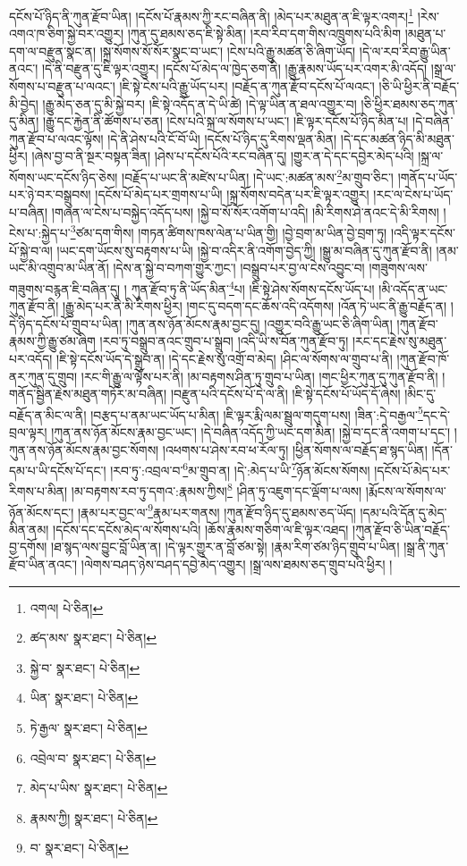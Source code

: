དངོས་པོ་ཉིད་ནི་ཀུན་རྫོབ་ཡིན། །དངོས་པོ་རྣམས་ཀྱི་རང་བཞིན་ནི། །མེད་པར་མཐུན་ན་ཇི་ལྟར་འགར།\footnote{འགལ།  པེ་ཅིན། } །རེས་འགའ་ཁ་ཅིག་སྐྱེ་བར་འགྱུར། །ཀུན་དུ་ཐམས་ཅད་ཇི་སྟེ་མིན། །རབ་རིབ་དག་གིས་འཁྲུགས་པའི་མིག །མཐུན་པ་དག་ལ་བརྫུན་སྣང་ན། །སྐྲ་སོགས་སོ་སོར་སྣང་བ་ཡང་། །ངེས་པའི་རྒྱུ་མཚན་ཅི་ཞིག་ཡོད། །དེ་ལ་རབ་རིབ་རྒྱུ་ཡིན་ནའང་། །དེ་ནི་བརྫུན་དུ་ཇི་ལྟར་འགྱུར། །དངོས་པོ་མེད་ལ་ཁྱེད་ཅག་ནི། །རྒྱུ་རྣམས་ཡོད་པར་འགར་མི་འདོད། །སྒྲ་ལ་སོགས་པ་བརྫུན་པ་ལའང་། །ཇི་སྟེ་ངེས་པའི་རྒྱུ་ཡོད་པར། །བརྗོད་ན་ཀུན་རྫོབ་དངོས་པོ་ལའང་། །ཅི་ཡི་ཕྱིར་ནི་བརྗོད་མི་བྱེད། །རྒྱུ་མེད་ཅན་དུ་མི་སྐྱེ་བར། །ཇི་སྟེ་འདོད་ན་དེ་ཡི་ཚེ། །དེ་ལྟ་ཡིན་ན་ཐལ་འགྱུར་བ། །ཅི་ཕྱིར་ཐམས་ཅད་ཀུན་དུ་མིན། །རྒྱུ་དང་རྐྱེན་ནི་ཚོགས་པ་ཅན། །ངེས་པའི་སྐྲ་ལ་སོགས་པ་ཡང་། །ཇི་ལྟར་དངོས་པོ་ཉིད་མིན་པ། །དེ་བཞིན་ཀུན་རྫོབ་པ་ལའང་ལྟོས། །དེ་ནི་ཤེས་པའི་ངོ་བོ་ཡི། །དངོས་པོ་ཉིད་དུ་རིགས་ལྡན་མིན། །དེ་དང་མཚན་ཉིད་མི་མཐུན་ཕྱིར། །ཞེས་བྱ་བ་ནི་སྔར་བསྟན་ཟིན། །ཤེས་པ་དངོས་པོའི་རང་བཞིན་དུ། །གྱུར་ན་དེ་དང་དབྱེར་མེད་པའི། །སྐྲ་ལ་སོགས་ཡང་དངོས་ཉིད་ཅེས། །བརྗོད་པ་ཡང་ནི་མཛེས་པ་ཡིན། །དེ་ཡང་:མཚན་མས་\footnote{ཚད་མས་  སྣར་ཐང་།  པེ་ཅིན། }མ་གྲུབ་ཅིང་། །གནོད་པ་ཡོད་པར་ཉེ་བར་བསྒྲུབས། །དངོས་པོ་མེད་པར་གྲགས་པ་ཡི། །སྐྲ་སོགས་བདེན་པར་ཇི་ལྟར་འགྱུར། །རང་ལ་ངེས་པ་ཡོད་པ་བཞིན། །གཞན་ལ་ངེས་པ་བསྐྱེད་འདོད་པས། །སྐྱེ་བ་སོ་སོར་འགོག་པ་འདི། །མི་རིགས་ཤེ་ནའང་དེ་མི་རིགས། །ངེས་པ་:སྐྱེད་པ་\footnote{སྐྱེ་བ་  སྣར་ཐང་།  པེ་ཅིན། }ཙམ་དག་གིས། །གཏན་ཚིགས་ཁས་ལེན་པ་ཡིན་གྱི། །བྱེ་བྲག་མ་ཡིན་བྱེ་བྲག་ཏུ། །འདི་ལྟར་དངོས་པོ་སྐྱེ་བ་ལ། །ཡང་དག་ཡོངས་སུ་བརྟགས་པ་ཡི། །སྐྱེ་བ་འདིར་ནི་འགོག་བྱེད་ཀྱི། །སྒྱུ་མ་བཞིན་དུ་ཀུན་རྫོབ་ནི། །ནམ་ཡང་མི་འགྲུབ་མ་ཡིན་ནོ། །དེས་ན་སྐྱེ་བ་བཀག་གྱུར་ཀྱང་། །བསྒྲུབ་པར་བྱ་ལ་ངེས་འབྱུང་བ། །གཟུགས་ལས་གཟུགས་བརྙན་ཇི་བཞིན་དུ། །
ཀུན་རྫོབ་ཏུ་ནི་ཡོད་མིན་\footnote{ཡིན་  སྣར་ཐང་།  པེ་ཅིན། }པ། །ཇི་སྟེ་ཤེས་སོགས་དངོས་ཡོད་པ། །མི་འདོད་ན་ཡང་ཀུན་རྫོབ་ནི། །རྒྱུ་མེད་པར་ནི་མི་རིགས་ཕྱིར། །གང་དུ་བདག་དང་ཆོས་འདི་འདོགས། །འོན་ཏེ་ཡང་ནི་རྒྱུ་བརྗོད་ན། །དེ་ཉིད་དངོས་པོ་གྲུབ་པ་ཡིན། །ཀུན་ནས་ཉོན་མོངས་རྣམ་བྱང་དུ། །འགྱུར་བའི་རྒྱུ་ཡང་ཅི་ཞིག་ཡིན། །ཀུན་རྫོབ་རྣམས་ཀྱི་རྒྱུ་ཙམ་ཞིག །རབ་ཏུ་བསྒྲུབ་ནའང་གྲུབ་པ་སྒྲུབ། །འདི་ཡི་ས་བོན་ཀུན་རྫོབ་ཏུ། །རང་དང་རྗེས་སུ་མཐུན་པར་འདོད། །ཇི་སྟེ་དངོས་ཡོད་དེ་སྒྲུབ་ན། །དེ་དང་རྗེས་སུ་འགྲོ་བ་མེད། །ཤིང་ལ་སོགས་ལ་གྲུབ་པ་ནི། །ཀུན་རྫོབ་ཁོ་ནར་ཀུན་དུ་གྲུབ། །རང་གི་རྒྱུ་ལ་ལྟོས་པར་ནི། །མ་བརྟགས་ཤིན་ཏུ་གྲུབ་པ་ཡིན། །གང་ཕྱིར་ཀུན་དུ་ཀུན་རྫོབ་ནི། །གནོད་སྦྱིན་རྗེས་མཐུན་གཏོར་མ་བཞིན། །བརྫུན་པའི་དངོས་པོ་དེ་ལ་ནི། །ཇི་སྟེ་དངོས་པོ་ཡོད་དོ་ཞེས། །མིང་དུ་བརྗོད་ན་མིང་ལ་ནི། །བརྩད་པ་ནམ་ཡང་ཡོད་པ་མིན། །ཇི་ལྟར་རྨི་ལམ་སྦྲུལ་གདུག་པས། །ཟིན་:དེ་བརྒྱལ་\footnote{ཏེ་རྒྱལ་  སྣར་ཐང་།  པེ་ཅིན། }དང་དེ་བྲལ་ལྟར། །ཀུན་ནས་ཉོན་མོངས་རྣམ་བྱང་ཡང་། །དེ་བཞིན་འདོད་ཀྱི་ཡང་དག་མིན། །སྐྱེ་བ་དང་ནི་འགག་པ་དང་། །ཀུན་ནས་ཉོན་མོངས་རྣམ་བྱང་སོགས། །འཕགས་པ་ཤེས་རབ་ཕ་རོལ་ཏུ། །ཕྱིན་སོགས་ལ་བརྗོད་ཐ་སྙད་ཡིན། །དོན་དམ་པ་ཡི་དངོས་པོ་དང་། །རབ་ཏུ་:འབྲལ་བ་\footnote{འབྲེལ་བ་  སྣར་ཐང་།  པེ་ཅིན། }མ་གྲུབ་ན། །དེ་:མེད་པ་ཡི་\footnote{མེད་པ་ཡིས་  སྣར་ཐང་།  པེ་ཅིན། }ཉོན་མོངས་སོགས། །དངོས་པོ་མེད་པར་རིགས་པ་མིན། །མ་བརྟགས་རབ་ཏུ་དགའ་:རྣམས་ཀྱིས།\footnote{རྣམས་ཀྱི།  སྣར་ཐང་།  པེ་ཅིན། } །ཤིན་ཏུ་འཇུག་དང་ལྡོག་པ་ལས། །རྨོངས་ལ་སོགས་ལ་ཉོན་མོངས་དང་། །རྣམ་པར་བྱང་ལ་\footnote{བ་  སྣར་ཐང་།  པེ་ཅིན། }རྣམ་པར་གནས། །ཀུན་རྫོབ་ཉིད་དུ་ཐམས་ཅད་ཡོད། །དམ་པའི་དོན་དུ་མེད་མིན་ནམ། །དངོས་དང་དངོས་མེད་ལ་སོགས་པའི། །ཆོས་རྣམས་གཅིག་ལ་ཇི་ལྟར་འཐད། །ཀུན་རྫོབ་ཅི་ཡིན་བརྗོད་བྱ་དགོས། །ཐ་སྙད་ལས་བྱུང་བློ་ཡིན་ན། །དེ་ལྟར་གྱུར་ན་བློ་ཙམ་སྟེ། །རྣམ་རིག་ཙམ་ཉིད་གྲུབ་པ་ཡིན། །སྒྲ་ནི་ཀུན་རྫོབ་ཡིན་ནའང་། །ལེགས་བཤད་ཉེས་བཤད་དབྱེ་མེད་འགྱུར། །སྒྲ་ལས་ཐམས་ཅད་གྲུབ་པའི་ཕྱིར། །
